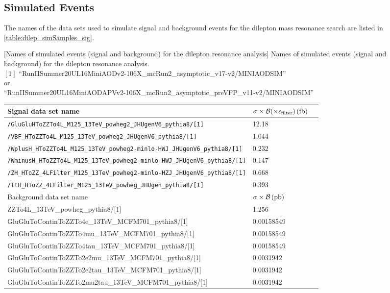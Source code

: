 \subsection{Simulated Events}
\label{sec:sim_samples_dilep}
The names of the data sets used to simulate signal and background events for the dilepton mass resonance search are listed in \cref{table:dilep_simSamples_sig}.
\begin{table}[h]
    \small
    \centering
        [Names of simulated events (signal and background) for the dilepton resonance analysis]
        {Names of simulated events (signal and background) for the dilepton resonance analysis. \\
        $[1]$ ``RunIISummer20UL16MiniAODv2-106X\_mcRun2\_asymptotic\_v17-v2/MINIAODSIM''
        \\
        or
        \\
        ``RunIISummer20UL16MiniAODAPVv2-106X\_mcRun2\_asymptotic\_preVFP\_v11-v2/MINIAODSIM''}
	\begin{tabular}{|lll|}
            \hline      
        Signal data set name & $\sigma \times \mathcal{B}(\times \epsilon_\text{filter})\,(\text{fb})$ \\
            \hline
		\texttt{/GluGluHToZZTo4L\_M125\_13TeV\_powheg2\_JHUgenV6\_pythia8/[1]}	&	12.18	\\
		\texttt{/VBF\_HToZZTo4L\_M125\_13TeV\_powheg2\_JHUgenV6\_pythia8/[1]} & 1.044       \\
		\texttt{/WplusH\_HToZZTo4L\_M125\_13TeV\_powheg2-minlo-HWJ\_JHUgenV6\_pythia8/[1]} & 0.232 \\
		\texttt{/WminusH\_HToZZTo4L\_M125\_13TeV\_powheg2-minlo-HWJ\_JHUgenV6\_pythia8/[1]} & 0.147 \\
		\texttt{/ZH\_HToZZ\_4LFilter\_M125\_13TeV\_powheg2-minlo-HZJ\_JHUgenV6\_pythia8/[1]} & 0.668 \\
		\texttt{/ttH\_HToZZ\_4LFilter\_M125\_13TeV\_powheg\_JHUgen\_pythia8/[1]} & 0.393 \\
            \hline	
            \hline	
        Background data set name & $\sigma \times \mathcal{B}\,(\text{pb})$ \\
            \hline	
		ZZTo4L\_13TeV\_powheg\_pythia8/[1]	&	1.256	\\
		GluGluToContinToZZTo4e\_13TeV\_MCFM701\_pythia8/[1]	&	0.00158549	\\
		GluGluToContinToZZTo4mu\_13TeV\_MCFM701\_pythia8/[1]	&	0.00158549	\\
		GluGluToContinToZZTo4tau\_13TeV\_MCFM701\_pythia8/[1]	&	0.00158549	\\
		GluGluToContinToZZTo2e2mu\_13TeV\_MCFM701\_pythia8/[1]	&	0.0031942	\\
		GluGluToContinToZZTo2e2tau\_13TeV\_MCFM701\_pythia8/[1]	&	0.0031942	\\
		GluGluToContinToZZTo2mu2tau\_13TeV\_MCFM701\_pythia8/[1]	&	0.0031942	\\
            \hline
        \end{tabular}
    \label{table:dilep_simSamples_bkg}
\end{table}